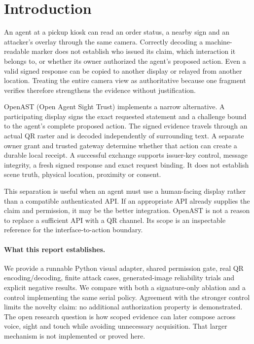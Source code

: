 \section{Introduction}
An agent at a pickup kiosk can read an order status, a nearby sign and an
attacker's overlay through the same camera. Correctly decoding a machine-readable
marker does not establish who issued its claim, which interaction it belongs to,
or whether its owner authorized the agent's proposed action. Even a valid signed
response can be copied to another display or relayed from another location.
Treating the entire camera view as authoritative because one fragment verifies
therefore strengthens the evidence without justification.

OpenAST (Open Agent Sight Trust) implements a narrow alternative. A participating
display signs the exact requested statement and a challenge bound to the agent's
complete proposed action. The signed evidence travels through an actual QR raster
and is decoded independently of surrounding text. A separate owner grant and
trusted gateway determine whether that action can create a durable local receipt.
A successful exchange supports issuer-key control, message integrity, a fresh
signed response and exact request binding. It does not establish scene truth,
physical location, proximity or consent.

This separation is useful when an agent must use a human-facing display rather
than a compatible authenticated API. If an appropriate API already supplies the
claim and permission, it may be the better integration. OpenAST is not a reason
to replace a sufficient API with a QR channel. Its scope is an inspectable
reference for the interface-to-action boundary.

\paragraph{What this report establishes.}
We provide a runnable Python visual adapter, shared permission gate, real QR
encoding/decoding, finite attack cases, generated-image reliability trials and
explicit negative results. We compare with both a signature-only ablation and a
control implementing the same serial policy. Agreement with the stronger control
limits the novelty claim: no additional authorization property is demonstrated.
The open research question is how scoped evidence can later compose across voice,
sight and touch while avoiding unnecessary acquisition. That larger mechanism
is not implemented or proved here.

